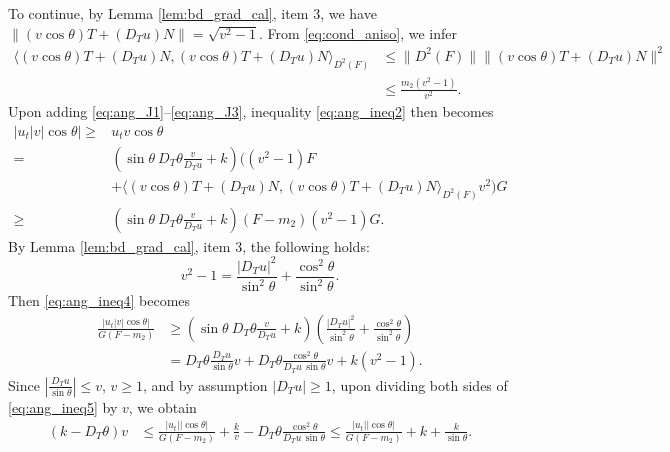 \documentclass[12pt]{article}
\numberwithin{equation}{section}
\theoremstyle{plain}
\theoremstyle{definition}
\theoremstyle{remark}
\begin{document}
To continue, by Lemma \ref{lem:bd_grad_cal}, item 3, we have $ \|(v \cos{\theta}) T + (D_T u) N\|=\sqrt{v^2-1}$. From \eqref{eq:cond_aniso}, we infer 
\begin{equation}
\begin{split}
    \Big\langle (v \cos{\theta}) T + (D_T u) N , (v \cos{\theta}) T + (D_T u) N \Big\rangle_{D^2 (F)} 
    & \leq \|D^2(F)\| \Big\|{(v \cos{\theta}) T + (D_T u) N} \Big\|^2 \\
    & \leq \frac{m_2 (v^2-1)}{v^2}.
\end{split}
\end{equation}
Upon adding \eqref{eq:ang_J1}--\eqref{eq:ang_J3}, inequality \eqref{eq:ang_ineq2} then becomes
\begin{equation} \label{eq:ang_ineq4}
\begin{split}
    |u_t| v |\cos{\theta}| \geq & u_t v \cos{\theta} \\
    = & \left( \sin{\theta} \ D_T \theta \frac{v}{D_T u} + k \right) \Bigg((v^2-1)F \\ & + \Big\langle (v \cos{\theta}) T + (D_T u) N , (v \cos{\theta}) T + (D_T u) N \Big\rangle_{D^2 (F)} v^2 \Bigg) G \\
    \geq & \left( \sin{\theta} \ D_T \theta \frac{v}{D_T u} + k \right) \left( F - m_2 \right) (v^2-1) G.
\end{split}
\end{equation}
By Lemma \ref{lem:bd_grad_cal}, item 3, the following holds: 
\begin{equation}
    v^2-1 = \frac{|D_T u|^2}{\sin^2 \theta} + \frac{\cos^2 \theta}{\sin^2 \theta}.
\end{equation}
Then \eqref{eq:ang_ineq4} becomes
\begin{equation}
\begin{split}
    \frac{|u_t| v |\cos{\theta}|}{G \left(F - m_2 \right)} & \geq \left( \sin{\theta} \ D_T \theta   \frac{v}{D_T u} + k \right) \left( \frac{|D_T u|^2}{\sin^2 \theta} + \frac{\cos^2 \theta}{\sin^2 \theta}  \right) \\
    & = D_T \theta \frac{D_T u}{\sin{\theta}} v + D_T \theta \frac{\cos^2 \theta}{D_T u\, \sin{\theta}} v + k(v^2-1).
\end{split}
\label{eq:ang_ineq5}
\end{equation}
Since $|\frac{D_T u}{\sin{\theta}}|\leq v$, $v\geq 1$,  and by assumption $|D_T u|\geq 1$, upon dividing both sides of \eqref{eq:ang_ineq5} by $v$, we obtain 
\begin{equation}
\begin{split}
    (k-D_T \theta)v & \leq \frac{|u_t| |\cos{\theta}|}{G \left(F - m_2 \right)} + \frac{k}{v} - D_T \theta \frac{\cos^2 \theta}{D_T u\, \sin{\theta}} 
    \leq \frac{|u_t| |\cos{\theta}|}{G \left(F - m_2 \right)} + k + \frac{k}{\sin{\theta}}.
\end{split}
\end{equation}
\end{document}
